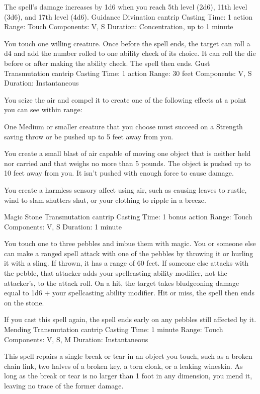 \documentclass[10pt,twoside,twocolumn]{book}
\begin{document}
The spell's damage increases by 1d6 when you reach 5th level (2d6), 11th level (3d6), and 17th level (4d6).
Guidance
Divination cantrip
Casting Time: 1 action
Range: Touch
Components: V, S
Duration: Concentration, up to 1 minute

You touch one willing creature. Once before the spell ends, the target can roll a d4 and add the number rolled to one ability check of its choice. It can roll the die before or after making the ability check. The spell then ends.
Gust
Transmutation cantrip
Casting Time: 1 action
Range: 30 feet
Components: V, S
Duration: Instantaneous

You seize the air and compel it to create one of the following effects at a point you can see within range:

    One Medium or smaller creature that you choose must succeed on a Strength saving throw or be pushed up to 5 feet away from you.

    You create a small blast of air capable of moving one object that is neither held nor carried and that weighs no more than 5 pounds. The object is pushed up to 10 feet away from you. It isn't pushed with enough force to cause damage.

    You create a harmless sensory affect using air, such as causing leaves to rustle, wind to slam shutters shut, or your clothing to ripple in a breeze.

Magic Stone
Transmutation cantrip
Casting Time: 1 bonus action
Range: Touch
Components: V, S
Duration: 1 minute

You touch one to three pebbles and imbue them with magic. You or someone else can make a ranged spell attack with one of the pebbles by throwing it or hurling it with a sling. If thrown, it has a range of 60 feet. If someone else attacks with the pebble, that attacker adds your spellcasting ability modifier, not the attacker's, to the attack roll. On a hit, the target takes bludgeoning damage equal to 1d6 + your spellcasting ability modifier. Hit or miss, the spell then ends on the stone.

If you cast this spell again, the spell ends early on any pebbles still affected by it.
Mending
Transmutation cantrip
Casting Time: 1 minute
Range: Touch
Components: V, S, M
Duration: Instantaneous

This spell repairs a single break or tear in an object you touch, such as a broken chain link, two halves of a broken key, a torn cloak, or a leaking wineskin. As long as the break or tear is no larger than 1 foot in any dimension, you mend it, leaving no trace of the former damage.
\end{document}
